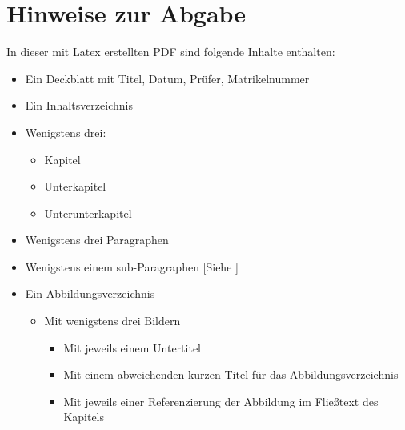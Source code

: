 \section*{Hinweise zur Abgabe} \label{chap:hinweise}

In dieser mit Latex erstellten PDF sind folgende Inhalte enthalten: 

\begin{itemize}
    \item Ein Deckblatt mit Titel, Datum, Prüfer, Matrikelnummer                               
    \item Ein Inhaltsverzeichnis      
    \item Wenigstens drei: 
        \begin{itemize}
            \item  Kapitel                                           
            \item  Unterkapitel                                                          
            \item  Unterunterkapitel
        \end{itemize}                                                                                                                   
    \item Wenigstens drei Paragraphen                                                           
    \item Wenigstens einem sub-Paragraphen                   [Siehe ]                                   
    \item Ein Abbildungsverzeichnis                                                             
    \begin{itemize}                                                                             
        \item Mit wenigstens drei Bildern                                                       
        \begin{itemize}                                                                         
            \item Mit jeweils einem Untertitel                                                  
            \item Mit einem abweichenden kurzen Titel für das Abbildungsverzeichnis             
            \item Mit jeweils einer Referenzierung der Abbildung im Fließtext des Kapitels      

\end{itemize}
\end{itemize}
\end{itemize}
